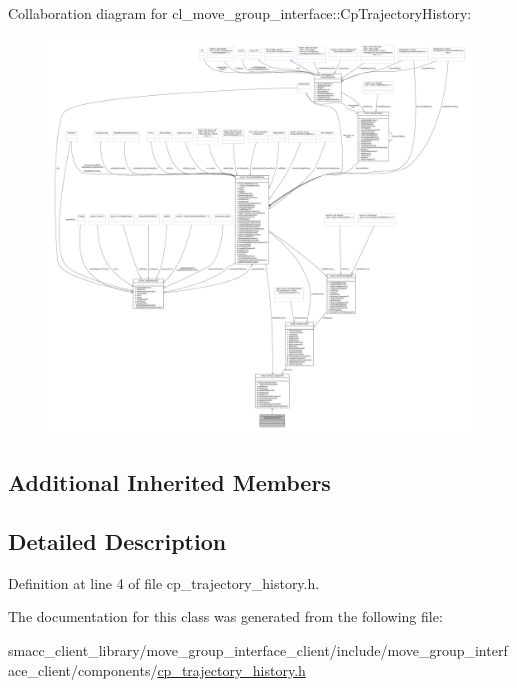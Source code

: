 Collaboration diagram for cl\+\_\+move\+\_\+group\+\_\+interface\+:\+:Cp\+Trajectory\+History\+:
\nopagebreak
\begin{figure}[H]
\begin{center}
\leavevmode
\includegraphics[width=350pt]{classcl__move__group__interface_1_1CpTrajectoryHistory__coll__graph}
\end{center}
\end{figure}
\subsection*{Additional Inherited Members}


\subsection{Detailed Description}


Definition at line 4 of file cp\+\_\+trajectory\+\_\+history.\+h.



The documentation for this class was generated from the following file\+:\begin{DoxyCompactItemize}
\item 
smacc\+\_\+client\+\_\+library/move\+\_\+group\+\_\+interface\+\_\+client/include/move\+\_\+group\+\_\+interface\+\_\+client/components/\hyperlink{cp__trajectory__history_8h}{cp\+\_\+trajectory\+\_\+history.\+h}\end{DoxyCompactItemize}
